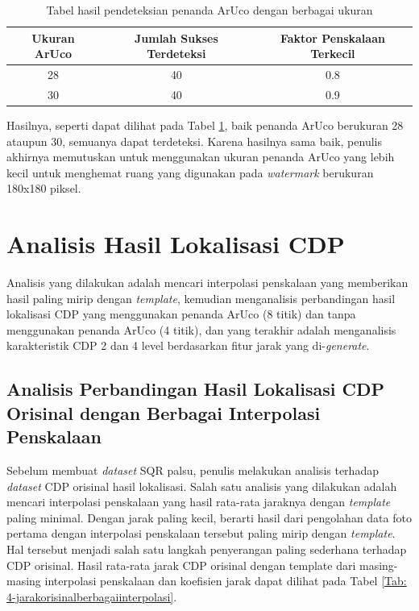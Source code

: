 \begin{table}[h]
	\caption{Tabel hasil pendeteksian penanda ArUco dengan berbagai ukuran}
	\vspace{0.5em}
	\centering
	\begin{tabular}{|c|c|c|}
		\hline
		\textbf{Ukuran ArUco} & \textbf{Jumlah Sukses Terdeteksi} & \textbf{Faktor Penskalaan Terkecil} \\
		\hline
		28                    & 40                                & 0.8                                 \\
		30                    & 40                                & 0.9                                 \\ \hline
	\end{tabular}
	\label{Tab: 4-tabelhasildeteksiaruco2}
\end{table}

Hasilnya, seperti dapat dilihat pada Tabel \ref{Tab: 4-tabelhasildeteksiaruco2}, baik penanda ArUco berukuran 28 ataupun 30, semuanya dapat terdeteksi. Karena
hasilnya sama baik, penulis akhirnya memutuskan untuk menggunakan ukuran penanda ArUco yang lebih kecil untuk menghemat ruang yang digunakan pada
\emph{watermark} berukuran 180x180 piksel.

\section{Analisis Hasil Lokalisasi CDP}
Analisis yang dilakukan adalah mencari interpolasi penskalaan yang memberikan hasil paling mirip dengan \emph{template}, kemudian menganalisis perbandingan
hasil lokalisasi CDP yang menggunakan penanda ArUco (8 titik) dan tanpa menggunakan penanda ArUco (4 titik), dan yang terakhir adalah menganalisis
karakteristik CDP 2 dan 4 level berdasarkan fitur jarak yang di-\emph{generate}.
\subsection{Analisis Perbandingan Hasil Lokalisasi CDP Orisinal dengan Berbagai Interpolasi Penskalaan}
Sebelum membuat \emph{dataset} SQR palsu, penulis melakukan analisis terhadap \emph{dataset} CDP orisinal hasil lokalisasi. Salah satu analisis yang dilakukan
adalah mencari interpolasi penskalaan yang hasil rata-rata jaraknya dengan \emph{template} paling minimal. Dengan jarak paling kecil, berarti hasil dari
pengolahan data foto pertama dengan interpolasi penskalaan tersebut paling mirip dengan \emph{template}. Hal tersebut menjadi salah satu langkah penyerangan
paling sederhana terhadap CDP orisinal. Hasil rata-rata jarak CDP orisinal dengan template dari masing-masing interpolasi penskalaan dan koefisien jarak dapat
dilihat pada Tabel \ref{Tab: 4-jarakorisinalberbagaiinterpolasi}.

